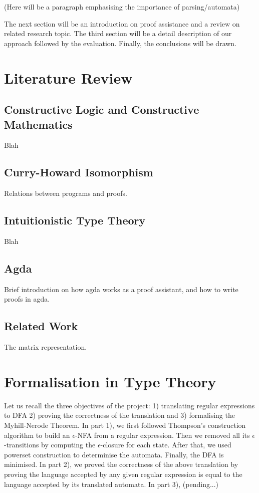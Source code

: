 \documentclass[twoside,openright,final]{bhamthesis}
\begin{document}
\par (Here will be a paragraph emphasising the importance of
parsing/automata)

\par The next section will be an introduction on proof assistance and
a review on related research topic. The third section will
be a detail description of our approach followed by the
evaluation. Finally, the conclusions will be drawn. 


\section{Literature Review}
\subsection{Constructive Logic and Constructive Mathematics}
Blah
\subsection{Curry-Howard Isomorphism}
Relations between programs and proofs.
\subsection{Intuitionistic Type Theory}
Blah
\subsection{Agda}
Brief introduction on how agda works as a proof assistant, and how to
write proofs in agda.
\subsection{Related Work}
The matrix representation.


\section{Formalisation in Type Theory}
Let us recall the three objectives of the project: 1) translating
regular expressions to DFA 2) proving the correctness of the translation 
and 3) formalising the Myhill-Nerode Theorem. In part 1), we first followed Thompson's
construction algorithm to build an \(\epsilon\)-NFA from a
regular expression. Then we removed all its \(\epsilon\)-transitions by computing the
\(\epsilon\)-closure for each state. After that, we used powerset
construction to determinise the automata. Finally, the DFA is
minimised. In part 2), we proved the correctness of the above
translation by proving the language accepted by any given regular expression is
equal to the language accepted by its translated automata. In part 3), (pending...)
\end{document}
